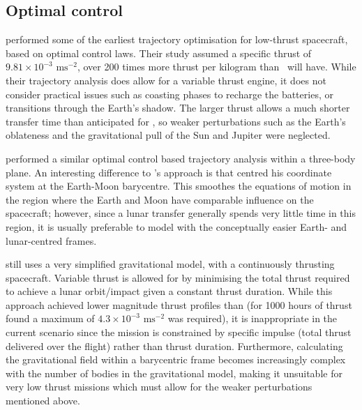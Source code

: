 \subsection{Optimal control} \label{sub:Optimal-control-lit}

\textcite{Golan1994} performed some of the earliest trajectory optimisation for low-thrust spacecraft, based on optimal control laws. Their study assumed a specific thrust of $9.81\times10^{-3}\text{ ms}^{-2}$, over 200 times more thrust per kilogram than \BW\ will have. While their trajectory analysis does allow for a variable thrust engine, it does not consider practical issues such as coasting phases to recharge the batteries, or transitions through the Earth's shadow. The larger thrust allows a much shorter transfer time than anticipated for \BW, so weaker perturbations such as the Earth's oblateness and the gravitational pull of the Sun and Jupiter were neglected.

\textcite{Guelman1995} performed a similar optimal control based trajectory analysis within a three-body plane. An interesting difference to \citeauthor{Golan1994}'s approach is that \citeauthor{Guelman1995} centred his coordinate system at the Earth-Moon barycentre. This smoothes the equations of motion in the region where the Earth and Moon have comparable influence on the spacecraft; however, since a lunar transfer generally spends very little time in this region, it is usually preferable to model with the conceptually easier Earth- and lunar-centred frames.
 
\citeauthor{Guelman1995} still uses a very simplified gravitational model, with a continuously thrusting spacecraft. Variable thrust is allowed for by minimising the total thrust required to achieve a lunar orbit/impact given a constant thrust duration. While this approach achieved lower magnitude thrust profiles than \citeauthor{Golan1994} (for 1000 hours of thrust \citeauthor{Guelman1995} found a maximum of $4.3\times10^{-3}\text{ ms}^{-2}$ was required), it is inappropriate in the current scenario since the mission is constrained by specific impulse (total thrust delivered over the flight) rather than thrust duration. Furthermore, calculating the gravitational field within a barycentric frame becomes increasingly complex with the number of bodies in the gravitational model, making it unsuitable for very low thrust missions which must allow for the weaker perturbations mentioned above.


